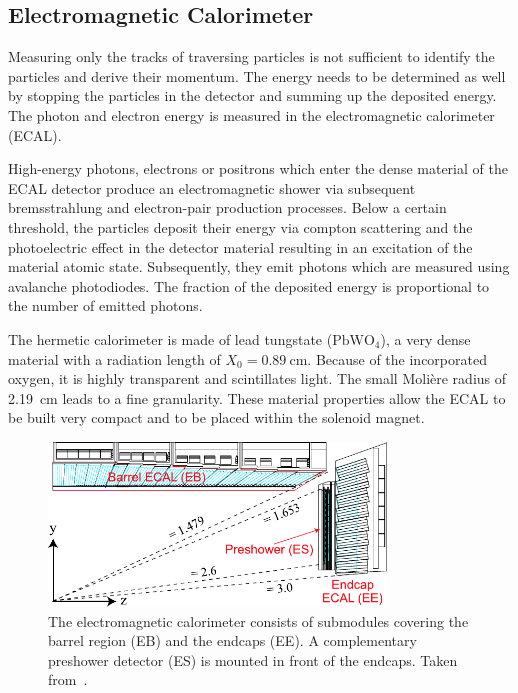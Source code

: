 \subsection{Electromagnetic Calorimeter}

Measuring only the tracks of traversing particles is not sufficient to identify
the particles and derive their momentum. The energy needs to be determined as well
by stopping the particles in the detector and summing up the
deposited energy. The photon and electron energy is measured in the
electromagnetic calorimeter (ECAL). 

High-energy photons, electrons or positrons which enter the dense material of
the ECAL detector produce an electromagnetic shower via subsequent
bremsstrahlung and electron-pair production processes. Below a certain
threshold, the particles deposit their energy via compton scattering and the
photoelectric effect in the detector material resulting in an excitation of the
material atomic state. Subsequently, they emit photons which are measured using
avalanche photodiodes. The fraction of the deposited energy is proportional to
the number of emitted photons.

The hermetic calorimeter is made of lead tungstate ($\mathrm{PbWO}_4$), a very
dense material with a radiation length of $X_0 = \SI{0.89}{\centi\meter}$.
Because of the incorporated oxygen, it is highly transparent and scintillates
light. The small Moli\`ere  radius of \SI{2.19}{\centi\meter} leads to a fine
granularity.  These material properties allow the ECAL to be built very compact
and to be placed within the solenoid magnet. 

\begin{figure}[htp]
    \centering
    \includegraphics[width=0.8\textwidth]{figures/experimental_setup/cms_ecal.pdf}\hfill
    \caption[Electromagnetic Calorimeter]{The electromagnetic calorimeter
    consists of submodules covering the barrel region (EB) and the endcaps (EE).
    A complementary preshower detector (ES) is mounted in front of the
    endcaps. Taken from~\cite{Bayatian:922757}.}
    \label{fig:cms:ecal}
\end{figure}

